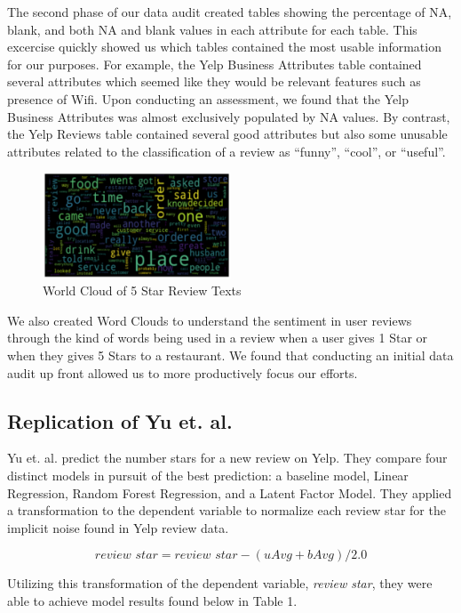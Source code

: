 \documentclass[12pt]{article}
\begin{document}
The second phase of our data audit created tables showing the percentage of NA, blank, and
both NA and blank values in each attribute for each table. This excercise quickly showed us
which tables contained the most usable information for our purposes. For example, the Yelp
Business Attributes table contained several attributes which seemed like they would be
relevant features such as presence of Wifi. Upon conducting an assessment, we found that
the Yelp Business Attributes was almost exclusively populated by NA values. By contrast, the
Yelp Reviews table contained several good attributes but also some unusable attributes
related to the classification of a review as ``funny'', ``cool'', or ``useful''. 

\begin{figure}[h]
  \caption{World Cloud of 5 Star Review Texts}
  \centering
  \includegraphics[width=0.5\textwidth]{WorldCloud}
  \end{figure}
  

We also created Word Clouds to understand the sentiment in user reviews through the kind of words being used in a review when a user gives 1 Star or when they gives 5 Stars to a restaurant. We found
that conducting an initial data audit up front allowed us to more productively focus our
efforts.

\subsection{Replication of Yu et. al.}

Yu et. al. \cite{yu2015restaurants} predict the number stars for a new review on Yelp.
They compare four distinct models in pursuit of the best prediction: a baseline model,
Linear Regression, Random Forest Regression, and a Latent Factor Model. They applied a
transformation to the dependent variable to normalize each review star for the implicit
noise found in Yelp review data.

\[
\textit{review star} = \textit{review star} - (uAvg + bAvg)/2.0
\]

Utilizing this transformation of the dependent variable, \textit{review star}, they were
able to achieve model results found below in Table 1.
\end{document}

